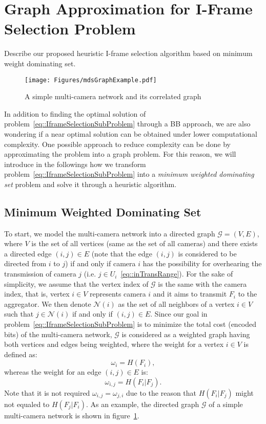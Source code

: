 \section{Graph Approximation for I-Frame Selection Problem}
\label{sec::graphApprox}
{\color{red}Describe our proposed heuristic I-frame selection algorithm based on minimum weight dominating set.}
%
\begin{figure}
\begin{center}
\texttt{[image: Figures/mdsGraphExample.pdf]}
\caption{\label{fig::mdsGraphExample}A simple multi-camera network and its correlated graph}
\end{center}
\end{figure}
%
In addition to finding the optimal solution of problem~\eqref{eq::IframeSelectionSubProblem} through a BB approach, we are also wondering if a near optimal solution can be obtained under lower computational complexity.
One possible approach to reduce complexity can be done by approximating the problem into a graph problem.
For this reason, we will introduce in the followings how we transform problem~\eqref{eq::IframeSelectionSubProblem} into a \emph{minimum weighted dominating set} problem and solve it through a heuristic algorithm.
%
\subsection{Minimum Weighted Dominating Set}
To start, we model the multi-camera network into a directed graph $\mathcal{G}=(V,E)$, where $V$ is the set of all vertices (same as the set of all cameras) and there exists a directed edge $(i,j) \in E$ (note that the edge $(i,j)$ is considered to be directed from $i$ to $j$) if and only if camera $i$ has the possibility for overhearing the transmission of camera $j$ (i.e. $j \in U_i$~\eqref{eq::inTransRange}).
For the sake of simplicity, we assume that the vertex index of $\mathcal{G}$ is the same with the camera index, that is, vertex $i \in V$ represents camera $i$ and it aims to transmit $F_i$ to the aggregator.
We then denote $\mathcal{N}(i)$ as the set of all neighbors of a vertex $i \in V$ such that $j \in \mathcal{N}(i)$ if and only if $(i,j) \in E$.
Since our goal in problem~\eqref{eq::IframeSelectionSubProblem} is to minimize the total cost (encoded bits) of the multi-camera network, $\mathcal{G}$ is considered as a weighted graph having both vertices and edges being weighted, where the weight for a vertex $i \in V$ is defined as:
\begin{equation}
\omega_i = H(F_i),
\end{equation}
whereas the weight for an edge $(i,j) \in E$ is:
\begin{equation}
\omega_{i,j} = H(F_i|F_j).
\end{equation}
Note that it is not required $\omega_{i,j} = \omega_{j,i}$ due to the reason that $H(F_i|F_j)$ might not equaled to $H(F_j|F_i)$.
As an example, the directed graph $\mathcal{G}$ of a simple multi-camera network is shown in figure~\ref{fig::mdsGraphExample}.
%

